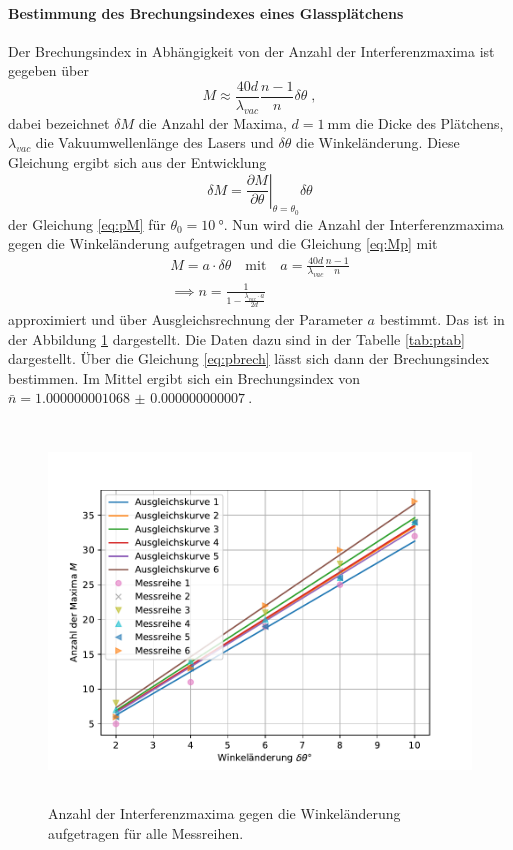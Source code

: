 \FloatBarrier

\paragraph{Bestimmung des Brechungsindexes eines Glassplätchens}
Der Brechungsindex in Abhängigkeit von der Anzahl der Interferenzmaxima ist gegeben über
\begin{equation}
M \approx \frac{40d}{\lambda_{vac}} \frac{n-1}{n} \delta \theta \;,
\label{eq:Mp}
\end{equation}
dabei bezeichnet $\delta M$ die Anzahl der Maxima, $d = \SI{1}{\milli\meter}$ 
die Dicke des Plätchens, $\lambda_{vac}$ die Vakuumwellenlänge des Lasers und 
$\delta \theta$ die Winkeländerung. Diese Gleichung ergibt sich aus der Entwicklung 
\begin{equation*}
\delta M = \left.\frac{\partial M}{\partial \theta} \right\rvert_{\theta = \theta_0 } \delta \theta
\end{equation*}
der Gleichung \eqref{eq:pM} für $\theta_0 = \SI{10}{\degree}$.
Nun wird die Anzahl der Interferenzmaxima gegen die Winkeländerung aufgetragen und die Gleichung 
\eqref{eq:Mp} mit 
\begin{gather}
M = a \cdot \delta\theta \quad \text{mit} \quad a =\frac{40d}{\lambda_{vac}} \frac{n-1}{n}
\label{eq:pfit} \\
\implies n = \frac{1}{1-\frac{\lambda_{vac} \cdot a}{2d}} 
\label{eq:pbrech}
\end{gather}
approximiert und über Ausgleichsrechnung der Parameter $a$ bestimmt. Das ist in der Abbildung 
\ref{fig:pfit} dargestellt. Die Daten dazu sind in der Tabelle \ref{tab:ptab} dargestellt.
Über die Gleichung \eqref{eq:pbrech} lässt sich dann der Brechungsindex bestimmen. Im Mittel 
ergibt sich ein Brechungsindex von $\bar{n} = \SI{1.000000001068(7)}{}$. 
\begin{figure}
  \centering
  \includegraphics[height = 10cm]{plots/Plaettchenplot.pdf}
  \caption{Anzahl der Interferenzmaxima gegen die Winkeländerung aufgetragen für alle Messreihen.}
  \label{fig:pfit}
\end{figure}
